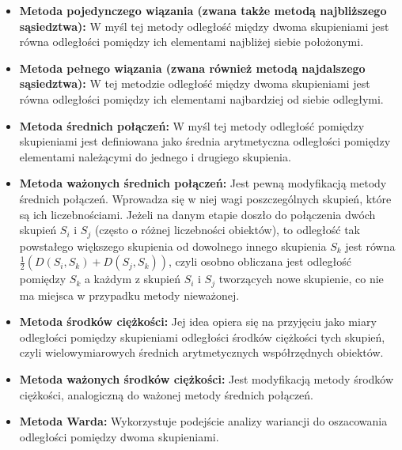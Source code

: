\documentclass{article}
\begin{document}
\begin{itemize}
    \item \textbf{Metoda pojedynczego wiązania (zwana także metodą najbliższego sąsiedztwa):} W myśl tej metody odległość między dwoma skupieniami jest równa odległości pomiędzy ich elementami najbliżej siebie położonymi.
    
    \item \textbf{Metoda pełnego wiązania (zwana również metodą najdalszego sąsiedztwa):} W tej metodzie odległość między dwoma skupieniami jest równa odległości pomiędzy ich elementami najbardziej od siebie odległymi.
    
    \item \textbf{Metoda średnich połączeń:} W myśl tej metody odległość pomiędzy skupieniami jest definiowana jako średnia arytmetyczna odległości pomiędzy elementami należącymi do jednego i drugiego skupienia.
    
    \item \textbf{Metoda ważonych średnich połączeń:} Jest pewną modyfikacją metody średnich połączeń. Wprowadza się w niej wagi poszczególnych skupień, które są ich liczebnościami. Jeżeli na danym etapie doszło do połączenia dwóch skupień $S_i$ i $S_j$ (często o różnej liczebności obiektów), to odległość tak powstałego większego skupienia od dowolnego innego skupienia $S_k$ jest równa $\frac{1}{2}(D(S_i, S_k) + D(S_j, S_k))$, czyli osobno obliczana jest odległość pomiędzy $S_k$ a każdym z skupień $S_i$ i $S_j$ tworzących nowe skupienie, co nie ma miejsca w przypadku metody nieważonej.
    
    \item \textbf{Metoda środków ciężkości:} Jej idea opiera się na przyjęciu jako miary odległości pomiędzy skupieniami odległości środków ciężkości tych skupień, czyli wielowymiarowych średnich arytmetycznych współrzędnych obiektów.
    
    \item \textbf{Metoda ważonych środków ciężkości:} Jest modyfikacją metody środków ciężkości, analogiczną do ważonej metody średnich połączeń.
    
    \item \textbf{Metoda Warda:} Wykorzystuje podejście analizy wariancji do oszacowania odległości pomiędzy dwoma skupieniami.
\end{itemize}
\end{document}
